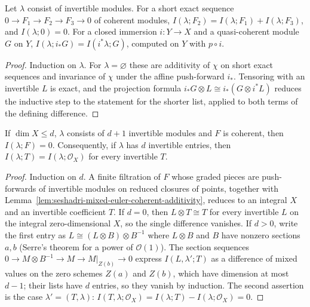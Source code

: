 \begin{lemma}
\label{lem:seshadri-mixed-euler-coherent-additivity}
\leanok
{}
Let $\lambda$ consist of invertible modules. For a short exact sequence
$0\to F_1\to F_2\to F_3\to0$ of coherent modules,
$I(\lambda;F_2)=I(\lambda;F_1)+I(\lambda;F_3)$, and $I(\lambda;0)=0$. For a closed immersion
$i:Y\to X$ and a quasi-coherent module $G$ on $Y$,
$I(\lambda;i_*G)=I(i^*\lambda;G)$, computed on $Y$ with $p\circ i$.
\end{lemma}
\begin{proof}
Induction on $\lambda$. For $\lambda=\varnothing$ these are additivity of $\chi$ on short
exact sequences and invariance of $\chi$ under the affine push-forward $i_*$. Tensoring with
an invertible $L$ is exact, and the projection formula $i_*G\otimes L\cong i_*(G\otimes i^*L)$
reduces the inductive step to the statement for the shorter list, applied to both terms of
the defining difference.
\end{proof}

\begin{theorem}
\label{thm:seshadri-mixed-euler-dimension-vanishing}
\leanok
{}
If $\dim X\le d$, $\lambda$ consists of $d+1$ invertible modules and $F$ is coherent, then
$I(\lambda;F)=0$. Consequently, if $\lambda$ has $d$ invertible entries, then
$I(\lambda;T)=I(\lambda;\mathcal O_X)$ for every invertible $T$.
\end{theorem}
\begin{proof}
Induction on $d$. A finite filtration of $F$ whose graded pieces are push-forwards of
invertible modules on reduced closures of points, together with
Lemma~\ref{lem:seshadri-mixed-euler-coherent-additivity}, reduces to an integral $X$ and an
invertible coefficient $T$. If $d=0$, then $L\otimes T\cong T$ for every invertible $L$ on
the integral zero-dimensional $X$, so the single difference vanishes. If $d>0$, write the
first entry as $L\cong(L\otimes B)\otimes B^{-1}$ where $L\otimes B$ and $B$ have nonzero
sections $a,b$ (Serre's theorem for a power of $\mathcal O(1)$). The section sequences
$0\to M\otimes B^{-1}\to M\to M|_{Z(b)}\to0$ express
$I(L,\lambda';T)$ as a difference of mixed values on the zero schemes $Z(a)$ and $Z(b)$,
which have dimension at most $d-1$; their lists have $d$ entries, so they vanish by
induction. The second assertion is the case $\lambda'=(T,\lambda)$:
$I(T,\lambda;\mathcal O_X)=I(\lambda;T)-I(\lambda;\mathcal O_X)=0$.
\end{proof}


